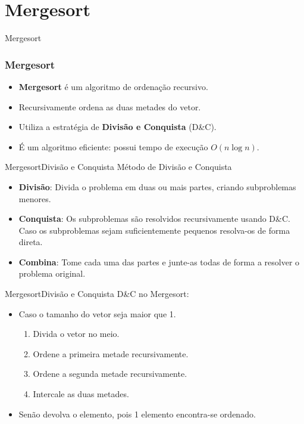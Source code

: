 \documentclass[aspectratio=169]{beamer}
\begin{document}
\section{Mergesort}

\begin{frame}
\Huge{\centerline{Mergesort}}
\end{frame}

\begin{frame}
\frametitle{Mergesort}
\begin{itemize}
\item {\bf Mergesort} é um algoritmo de ordenação recursivo.
\item Recursivamente ordena as duas metades do vetor.
\item Utiliza a estratégia de {\bf Divisão e Conquista} (D\&C).
\item É um algoritmo eficiente: possui tempo de execução $O(n\log n)$.
\end{itemize}
\end{frame}

\begin{frame}{Mergesort}{Divisão e Conquista}
Método de Divisão e Conquista
\begin{itemize}
\item {\bf Divisão}: Divida o problema em duas ou mais partes, criando subproblemas menores.
\item {\bf Conquista}: Os subproblemas são resolvidos recursivamente usando D\&C. Caso os subproblemas sejam suficientemente pequenos resolva-os de forma direta.
\item {\bf Combina}: Tome cada uma das partes e junte-as todas de forma a resolver o problema original.
\end{itemize}
\end{frame}


\begin{frame}{Mergesort}{Divisão e Conquista}
D\&C no Mergesort:
\begin{itemize}
\item Caso o tamanho do vetor seja maior que 1.
\begin{enumerate}
\item Divida o vetor no meio.
\item Ordene a primeira metade recursivamente.
\item Ordene a segunda metade recursivamente.
\item Intercale as duas metades.
\end{enumerate}
\item Senão devolva o elemento, pois 1 elemento encontra-se ordenado.
\end{itemize}
\end{frame}
\end{document}
